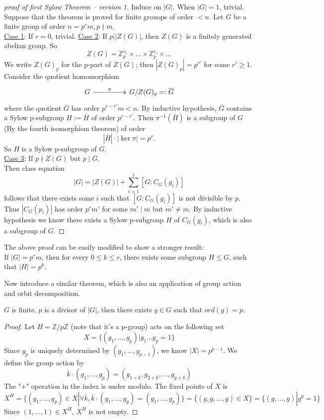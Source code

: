 \documentclass[11pt,fleqn]{book} %
\begin{document}
\begin{CJK}{UTF8}{gkai}
\begin{proof}
	[proof of first Sylow Theorem -- version 1]
	Induce on $|G|$. When $|G| = 1$, trivial. \\
	Suppose that the theorem is proved for finite grouops of order $< n$. Let $G$ be a finite group of order $n=p^rm, p \nmid m$. \\
	\underline{Case 1}: If $r = 0$, trivial.
	\underline{Case 2}: If $p | |Z(G)|$, then $Z(G)$ is a finitely generated abelian group. So 
	\[Z(G) = \mathbb{Z}_p^{r_1} \times ... \times \mathbb{Z}_p^{r_s} \times ...\]
	We write $Z(G)_p$ for the p-part of $Z(G)$; then $|Z(G)_p| = p^{r'}$ for some $r' \geq 1$. \\
	Consider the quotient homomorphism \[\begin{tikzcd}
		G && {G/Z(G)_p=:\overline{G}}
		\arrow["\pi", two heads, from=1-1, to=1-3]
	\end{tikzcd}\]
	where the quotient $\overline{G}$ has order $p^{r-r'}m<n$. By inductive hypothesis, $\overline{G}$ contains a Sylow p-subgroup $H := \overline{H}$ of order $p^{r-r'}$. Then $\pi^{-1}(\overline{H})$ is a subgroup of $G$ (By the fourth isomorphism theorem) of order 
	\[|\overline{H}|\cdot |\ker \pi| = p^r.\]
	So $H$ is a Sylow p-subgroup of $G$.  \\
	\underline{Case 3}: If $p \nmid Z(G)$ but $p \mid G$. \\
	Then class equation 
	\[|G| = |Z(G)| + \sum_{i=1}^t [G:C_G(g_i)]\]
	follows that there exists some $i$ such that $[G : C_G(g_i)]$ is not divisible by $p$. Thus $|C_G(p_i)|$ has order $p^r m'$ for some $m' \mid m$ but $m' \neq m$.
	By inductive hypothesis we know there exists a Sylow p-subgroup $H$ of $C_G(g_i)$, which is also a subgroup of $G$.
\end{proof} 

\begin{remark}
	The above proof can be easily modified to show a stronger result:\\
	If $|G| = p^rm$, then for every $0 \leq k \leq r$, there exists some subgroup $H \leq G$, such that $|H| = p^k$.
\end{remark}

Now introduce a similar theorem, which is also an application of group action and orbit decomposition.
\begin{theorem}
	[A. L. Cauchy] $G$ is finite, $p$ is a divisor of $|G|$, then there exists $g \in G$ such that $ord(g) = p$.
\end{theorem}
\begin{proof}
	Let $H = \mathbb{Z}/p\mathbb{Z}$ (note that it's a p-group) acts on the following set
	\[X = \{(g_1,...,g_p) | g_1...g_p = 1\}\]
	Since $g_p$ is uniquely determined by $(g_1,...,g_{p-1})$, we know $|X| = p^{p-1}$.
	We define the group action by 
	\[\overline{k} \cdot (g_1,...,g_p) = (g_{1+k},g_{2+k},...,g_{p+k})\]
	The "$+$" operation in the index is under modulo.
	The fixed points of $X$ is 
	\[X^H = \{(g_1,...,g_p) \in X | \forall \overline{k}, \overline{k}\cdot (g_1,...,g_p) = (g_1,...,g_p)\}=\{(g,g,...,g)\in X\} = \{(g,...,g) | g^p = 1\} \]
	Since $(1,...,1) \in X^H$, $X^H$ is not empty.


\end{proof}
\end{CJK}
\end{document}
